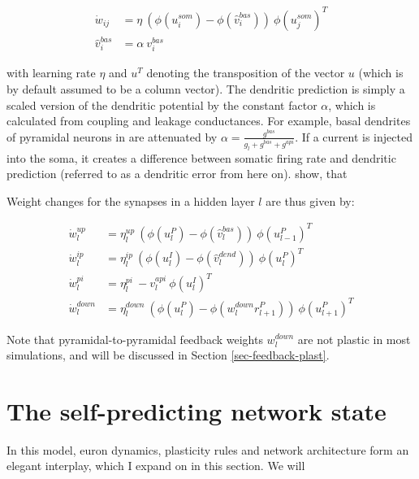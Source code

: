 \begin{align}
  \dot{w}_{ij}    & = \eta \ ( \phi(u_i^{som}) - \phi(\hat{v}_i^{bas}) ) \ \phi(u_j^{som})^T \\
  \hat{v}_i^{bas} & = \alpha \  v_i^{bas}
\end{align}

with learning rate $\eta$ and $u^T$ denoting the transposition of the vector $u$ (which is by default assumed to be a
column vector). The dendritic prediction is simply a scaled version of the dendritic potential by the constant factor
$\alpha$, which is calculated from coupling and leakage conductances. For example, basal dendrites of pyramidal neurons
in \cite{sacramento2018dendritic} are attenuated by $\alpha = \frac{g^{bas}}{g_l + g^{bas} + g^{api}}$. If a current is
injected into the soma, it creates a difference between somatic firing rate and dendritic prediction (referred to as a
dendritic error from here on). \cite{urbanczik2014learning} show, that 





Weight changes for the synapses in a hidden layer $l$ are thus given by:

\begin{align}
  \dot{w}_{l}^{up}   & = \eta_l^{up} \ ( \phi(u_l^{P}) - \phi(\hat{v}_l^{bas}) ) \ \phi(u_{l-1}^{P})^T\label{eq-delta_w_up}         \\
  \dot{w}_{l}^{ip}   & = \eta_l^{ip} \ ( \phi(u_l^{I}) - \phi(\hat{v}_l^{dend}) ) \ \phi(u_{l}^{P})^T\label{eq-delta_w_ip}          \\
  \dot{w}_{l}^{pi}   & = \eta_l^{pi} \ - v_l^{api} \ \phi(u_l^{I})^T\label{eq-delta_w_pi}                                           \\
  \dot{w}_{l}^{down} & = \eta_l^{down} \ ( \phi(u_l^{P}) - \phi(w_l^{down} r_{l+1}^P) )\ \phi(u_{l+1}^{P})^T\label{eq-delta_w_down}
\end{align}

Note that pyramidal-to-pyramidal feedback weights $w_l^{down}$ are not plastic in most simulations, and will be
discussed in Section \ref{sec-feedback-plast}.



\section{The self-predicting network state}

In this model, euron dynamics, plasticity rules and network architecture form an elegant interplay, which I expand on in
this section. We will

